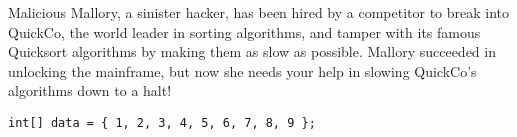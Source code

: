 Malicious Mallory, a sinister hacker, has been hired by a competitor to break into QuickCo, the world leader in sorting algorithms, and tamper with its famous Quicksort algorithms by making them as slow as possible. Mallory succeeded in unlocking the mainframe, but now she needs your help in slowing QuickCo's algorithms down to a halt!

\begin{lstlisting}
int[] data = { 1, 2, 3, 4, 5, 6, 7, 8, 9 };
\end{lstlisting}

